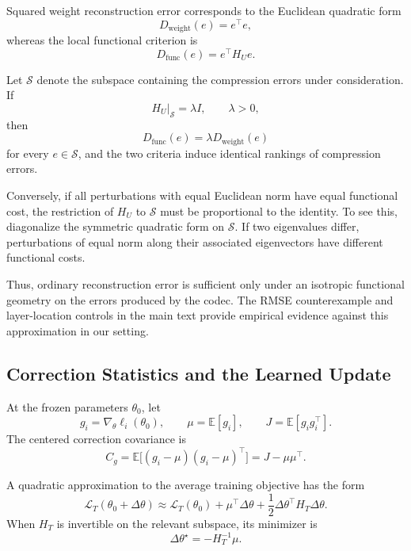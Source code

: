 Squared weight reconstruction error corresponds to the Euclidean quadratic
form
\[
    D_{\mathrm{weight}}(e)=e^\top e,
\]
whereas the local functional criterion is
\[
    D_{\mathrm{func}}(e)=e^\top H_Ue.
\]

Let $\mathcal{S}$ denote the subspace containing the compression errors under
consideration.
If
\begin{equation}
    H_U|_{\mathcal{S}}=\lambda I,
    \qquad \lambda>0,
    \label{eq:isotropic-condition}
\end{equation}
then
\[
    D_{\mathrm{func}}(e)
    =
    \lambda D_{\mathrm{weight}}(e)
\]
for every $e\in\mathcal{S}$, and the two criteria induce identical rankings of
compression errors.

Conversely, if all perturbations with equal Euclidean norm have equal
functional cost, the restriction of $H_U$ to $\mathcal{S}$ must be proportional
to the identity.
To see this, diagonalize the symmetric quadratic form on $\mathcal{S}$.
If two eigenvalues differ, perturbations of equal norm along their associated
eigenvectors have different functional costs.

Thus, ordinary reconstruction error is sufficient only under an isotropic
functional geometry on the errors produced by the codec.
The RMSE counterexample and layer-location controls in the main text provide
empirical evidence against this approximation in our setting.

\subsection{Correction Statistics and the Learned Update}
\label{app:correction-statistics}

At the frozen parameters $\theta_0$, let
\[
    g_i=\nabla_\theta\ell_i(\theta_0),
    \qquad
    \mu=\mathbb{E}[g_i],
    \qquad
    J=\mathbb{E}[g_ig_i^\top].
\]
The centered correction covariance is
\begin{equation}
    C_g
    =
    \mathbb{E}\big[
        (g_i-\mu)(g_i-\mu)^\top
    \big]
    =
    J-\mu\mu^\top.
    \label{eq:app-centered-gradient}
\end{equation}

A quadratic approximation to the average training objective has the form
\[
    \mathcal{L}_T(\theta_0+\Delta\theta)
    \approx
    \mathcal{L}_T(\theta_0)
    +
    \mu^\top\Delta\theta
    +
    \frac{1}{2}
    \Delta\theta^\top H_T\Delta\theta.
\]
When $H_T$ is invertible on the relevant subspace, its minimizer is
\begin{equation}
    \Delta\theta^\star
    =
    -H_T^{-1}\mu.
    \label{eq:app-newton-update}
\end{equation}

